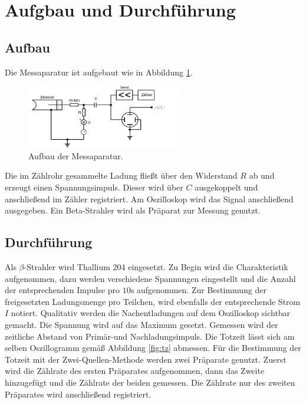 \section{Aufgbau und Durchführung}
\label{sec:Durchführung}
\subsection{Aufbau}
Die Messaparatur ist aufgebaut wie in Abbildung \ref{fig:aufbau}.
\begin{figure}
  \centering
  \includegraphics[width=0.6\textwidth]{aufbau.PNG}
  \caption{Aufbau der Messaparatur.}
  \label{fig:aufbau}
\end{figure}
Die im Zählrohr gesammelte Ladung fließt über den Widerstand $R$ ab und erzeugt einen Spannungsimpuls. Dieser wird über $C$ ausgekoppelt und
anschließend im Zähler registriert. Am Oszilloskop wird das Signal anschließend ausgegeben. Ein Beta-Strahler wird als Präparat
zur Messung genutzt.
\subsection{Durchführung}
Als $\beta$-Strahler wird Thallium 204 eingesetzt.
Zu Begin wird die Charakteristik aufgenommen, dazu werden verschiedene Spannungen eingestellt und die Anzahl der entsprechenden
Impulse pro $10\si{\second}$ aufgenommen. Zur Bestimmung der freigesetzten Ladungsmenge pro Teilchen, wird ebenfalls der entsprechende
Strom $I$ notiert.
Qualitativ werden die Nachentladungen auf dem Oszilloskop sichtbar gemacht. Die Spannung wird auf das Maximum gesetzt. Gemessen
wird der zeitliche Abstand von Primär-und Nachladungsimpuls. Die Totzeit lässt sich am selben
Oszillogramm gemäß Abbildung \ref{fig:tz} abmessen.
Für die Bestimmung der Totzeit mit der Zwei-Quellen-Methode werden zwei Präparate genutzt. Zuerst wird die Zählrate
des ersten Präparates aufgenommen, dann das Zweite hinzugefügt und die Zählrate der beiden gemessen. Die Zählrate nur des zweiten Präparates
wird anschließend registriert.
